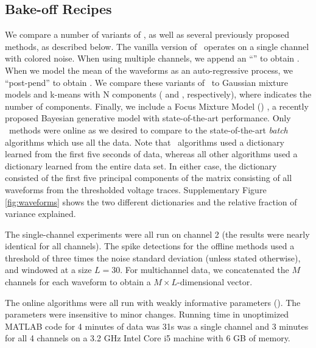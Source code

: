 \subsection{Bake-off Recipes}

We compare a number of variants of \smug, as well as several previously proposed methods, as described below.  The vanilla version of \smug\ operates on a single channel with colored noise.  When using multiple channels, we append an ``'' to obtain \smug.  When we model the mean of the waveforms as an auto-regressive process, we ``post-pend'' to obtain \smug{}.  
We compare these variants of \smug\ to Gaussian mixture models and k-means with N components ( and , respectively), where  indicates the number of components.  Finally, we include a Focus Mixture Model () \cite{??}, a recently proposed Bayesian generative model with state-of-the-art performance.  Only \smug\ methods were online as we desired to compare to the state-of-the-art \emph{batch} algorithms which use all the data. 
Note that \smug\ algorithms used a dictionary learned from the first five seconds of data, whereas all other algorithms used a dictionary learned from the entire data set.  In either case, the dictionary consisted of the first five principal components of the matrix consisting of all waveforms from the thresholded voltage traces.  Supplementary Figure \ref{fig:waveforms} shows the two different dictionaries and the relative fraction of variance explained.

% 
% 
The single-channel experiments were all run on channel 2 (the results were nearly identical for all channels).  The spike detections for the offline methods used a threshold of three times the noise standard deviation \cite{Lewicki} (unless stated otherwise), and windowed at a size $L=30$.  For multichannel data, we concatenated the $M$ channels for each waveform to obtain a $M\times L$-dimensional vector.


The online algorithms were all run with weakly informative parameters (). The parameters were insensitive to minor changes.  Running time in unoptimized MATLAB code for 4 minutes of data was 31s was a single channel and 3 minutes for all 4 channels on a 3.2 GHz Intel Core i5 machine with 6 GB of memory.


